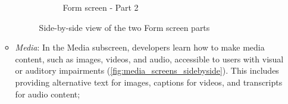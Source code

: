 \begin{enumerate}
\begin{itemize}
\begin{figure}[ht]
\begin{subfigure}[b]{0.48\textwidth}
                \caption{Form screen - Part 2}
                \label{fig:form-right}
            \end{subfigure}
            \caption{Side-by-side view of the two Form screen parts}
            \label{fig:form_screens_sidebyside}
        \end{figure}

        \item \textit{Media}: In the Media subscreen, developers learn how to make media content, such as images, videos, and audio, accessible to users with visual or auditory impairments (\ref{fig:media_screens_sidebyside}). This includes providing alternative text for images, captions for videos, and transcripts for audio content;

        \begin{figure}[ht]
            \centering
            \begin{subfigure}[b]{0.48\textwidth}
                \centering

\end{subfigure}
\end{figure}
\end{itemize}
\end{enumerate}
